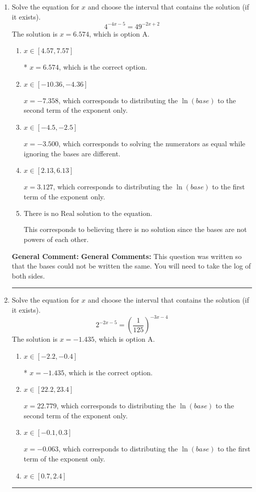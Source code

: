 \documentclass{extbook}[14pt]
\newcommand{\litem}[1]{\item #1

\rule{\textwidth}{0.4pt}}
\begin{document}
\begin{enumerate}\litem{
Solve the equation for $x$ and choose the interval that contains the solution (if it exists).
\[ 4^{-4x-5} = 49^{-2x+2} \]
The solution is \( x = 6.574 \), which is option A.\begin{enumerate}[label=\Alph*.]
\item \( x \in [4.57, 7.57] \)

* $x = 6.574$, which is the correct option.
\item \( x \in [-10.36, -4.36] \)

$x = -7.358$, which corresponds to distributing the $\ln(base)$ to the second term of the exponent only.
\item \( x \in [-4.5, -2.5] \)

$x = -3.500$, which corresponds to solving the numerators as equal while ignoring the bases are different.
\item \( x \in [2.13, 6.13] \)

$x = 3.127$, which corresponds to distributing the $\ln(base)$ to the first term of the exponent only.
\item \( \text{There is no Real solution to the equation.} \)

This corresponds to believing there is no solution since the bases are not powers of each other.
\end{enumerate}

\textbf{General Comment:} \textbf{General Comments:} This question was written so that the bases could not be written the same. You will need to take the log of both sides.
}
\litem{
Solve the equation for $x$ and choose the interval that contains the solution (if it exists).
\[ 2^{-2x-5} = \left(\frac{1}{125}\right)^{-3x-4} \]
The solution is \( x = -1.435 \), which is option A.\begin{enumerate}[label=\Alph*.]
\item \( x \in [-2.2, -0.4] \)

* $x = -1.435$, which is the correct option.
\item \( x \in [22.2, 23.4] \)

$x = 22.779$, which corresponds to distributing the $\ln(base)$ to the second term of the exponent only.
\item \( x \in [-0.1, 0.3] \)

$x = -0.063$, which corresponds to distributing the $\ln(base)$ to the first term of the exponent only.
\item \( x \in [0.7, 2.4] \)


\end{enumerate}}
\end{enumerate}
\end{document}
